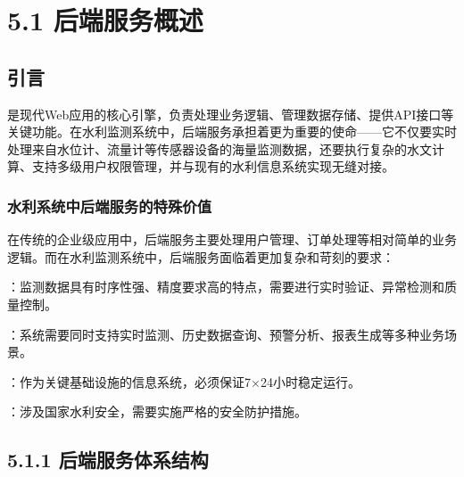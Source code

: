 \hypertarget{ux540eux7aefux670dux52a1ux6982ux8ff0}{%
\section{5.1 后端服务概述}\label{ux540eux7aefux670dux52a1ux6982ux8ff0}}


\hypertarget{ux5f15ux8a00-1}{%
\subsection{引言}\label{ux5f15ux8a00-1}}

是现代Web应用的核心引擎，负责处理业务逻辑、管理数据存储、提供API接口等关键功能。在水利监测系统中，后端服务承担着更为重要的使命------它不仅要实时处理来自水位计、流量计等传感器设备的海量监测数据，还要执行复杂的水文计算、支持多级用户权限管理，并与现有的水利信息系统实现无缝对接。

\hypertarget{ux6c34ux5229ux7cfbux7edfux4e2dux540eux7aefux670dux52a1ux7684ux7279ux6b8aux4ef7ux503c}{%
\subsubsection{水利系统中后端服务的特殊价值}\label{ux6c34ux5229ux7cfbux7edfux4e2dux540eux7aefux670dux52a1ux7684ux7279ux6b8aux4ef7ux503c}}

在传统的企业级应用中，后端服务主要处理用户管理、订单处理等相对简单的业务逻辑。而在水利监测系统中，后端服务面临着更加复杂和苛刻的要求：

：监测数据具有时序性强、精度要求高的特点，需要进行实时验证、异常检测和质量控制。

：系统需要同时支持实时监测、历史数据查询、预警分析、报表生成等多种业务场景。

：作为关键基础设施的信息系统，必须保证7×24小时稳定运行。

：涉及国家水利安全，需要实施严格的安全防护措施。

\hypertarget{ux540eux7aefux670dux52a1ux4f53ux7cfbux7ed3ux6784}{%
\subsection{5.1.1 后端服务体系结构}\label{ux540eux7aefux670dux52a1ux4f53ux7cfbux7ed3ux6784}}

